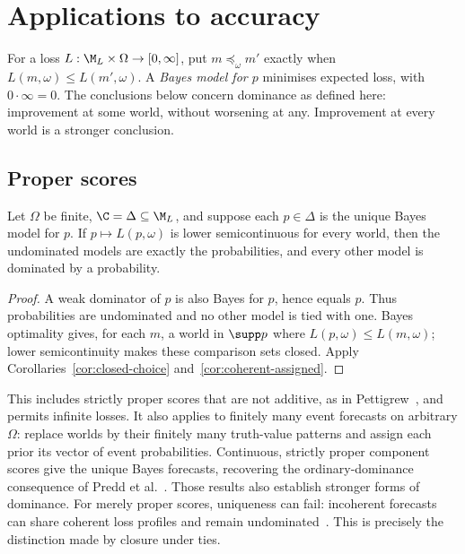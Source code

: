 \section{Applications to accuracy}\label{sec:short-applications}
For a loss $L:\M_L\times\Omega\to[0,\infty]$, put $m\preceq_\omega m'$ exactly when $L(m,\omega)\le L(m',\omega)$. A \emph{Bayes model for $p$} minimises expected loss, with $0\cdot\infty=0$. The conclusions below concern dominance as defined here: improvement at some world, without worsening at any. Improvement at every world is a stronger conclusion.

\subsection{Proper scores}
\begin{proposition}\label{prop:short-proper}
Let $\Omega$ be finite, $\C=\Delta\subseteq\M_L$, and suppose each $p\in\Delta$ is the unique Bayes model for $p$. If $p\mapsto L(p,\omega)$ is lower semicontinuous for every world, then the undominated models are exactly the probabilities, and every other model is dominated by a probability.
\end{proposition}
\begin{proof}
A weak dominator of $p$ is also Bayes for $p$, hence equals $p$. Thus probabilities are undominated and no other model is tied with one. Bayes optimality gives, for each $m$, a world in $\supp p$ where $L(p,\omega)\le L(m,\omega)$; lower semicontinuity makes these comparison sets closed. Apply Corollaries~\ref{cor:closed-choice} and~\ref{cor:coherent-assigned}.
\end{proof}
This includes strictly proper scores that are not additive, as in Pettigrew~\cite{Pettigrew}, and permits infinite losses. It also applies to finitely many event forecasts on arbitrary $\Omega$: replace worlds by their finitely many truth-value patterns and assign each prior its vector of event probabilities. Continuous, strictly proper component scores give the unique Bayes forecasts, recovering the ordinary-dominance consequence of Predd et al.~\cite{Predd}. Those results also establish stronger forms of dominance. For merely proper scores, uniqueness can fail: incoherent forecasts can share coherent loss profiles and remain undominated~\cite{SSK09}. This is precisely the distinction made by closure under ties.

